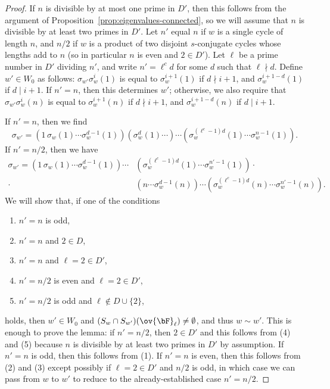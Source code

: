 \begin{proof}
    If $n$ is divisible by at most one prime in $D'$, then this follows from the argument of Proposition~\ref{prop:eigenvalues-connected}, so we will assume that $n$ is divisible by at least two primes in $D'$. Let $n'$ equal $n$ if $w$ is a single cycle of length $n$, and $n/2$ if $w$ is a product of two disjoint $s$-conjugate cycles whose lengths add to $n$ (so in particular $n$ is even and $2 \in D'$). Let $\ell$ be a prime number in $D'$ dividing $n'$, and write $n' = \ell^c d$ for some $d$ such that $\ell \nmid d$. Define $w' \in W_0$ as follows: $\sigma_{w'}\sigma_w^i(1)$ is equal to $\sigma_w^{i+1}(1)$ if $d \nmid i+1$, and $\sigma_w^{i+1 - d}(1)$ if $d \mid i + 1$. If $n' = n$, then this determines $w'$; otherwise, we also require that $\sigma_{w'}\sigma_w^i(n)$ is equal to $\sigma_w^{i+1}(n)$ if $d \nmid i+1$, and $\sigma_w^{i+1 - d}(n)$ if $d \mid i+1$.\smallskip
    
    If $n' = n$, then we find
    \[
    \sigma_{w'} = (1 \,\sigma_w(1) \cdots \sigma_w^{d-1}(1))(\sigma_w^d(1) \cdots ) \cdots (\sigma_w^{(\ell^c - 1)d}(1) \cdots \sigma_w^{n - 1}(1)).
    \]
    If $n' = n/2$, then we have
    \begin{align*}
    \sigma_{w'} = (1 \,\sigma_w(1) \cdots \sigma_w^{d-1}(1))\cdots &(\sigma_w^{(\ell^c - 1)d}(1) \cdots \sigma_w^{n' - 1}(1)) \cdot \\
        \cdot &(n \cdots \sigma_w^{d - 1}(n)) \cdots (\sigma_w^{(\ell^c - 1)d}(n) \cdots \sigma_w^{n'-1}(n)).
    \end{align*}
    We will show that, if one of the conditions
    \begin{enumerate}
        \item $n' = n$ is odd,
        \item $n' = n$ and $2 \in D$,
        \item $n' = n$ and $\ell = 2 \in D'$,
        \item $n' = n/2$ is even and $\ell = 2 \in D'$,
        \item $n' = n/2$ is odd and $\ell \not\in D \cup \{2\}$,
    \end{enumerate}
    holds, then $w' \in W_0$ and $(S_w \cap S_{w'})(\ov{\bF}_\ell) \neq \emptyset$, and thus $w \sim w'$. This is enough to prove the lemma: if $n' = n/2$, then $2 \in D'$ and this follows from (4) and (5) because $n$ is divisible by at least two primes in $D'$ by assumption. If $n' = n$ is odd, then this follows from (1). If $n' = n$ is even, then this follows from (2) and (3) except possibly if $\ell = 2 \in D'$ and $n/2$ is odd, in which case we can pass from $w$ to $w'$ to reduce to the already-established case $n' = n/2$. \smallskip


\end{proof}
